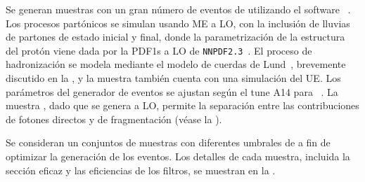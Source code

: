 Se generan muestras con un gran n\'umero de eventos de \gammajet utilizando el software ~\cite{Pythia8.1}. Los procesos partónicos se simulan usando \ac{ME} a \ac{LO}, con la inclusión de lluvias de partones de estado inicial y final, donde la parametrización de la estructura del protón viene dada por la \acp{PDF1} a \ac{LO} de \texttt{NNPDF2.3}~\cite{NNPDF2}.
El proceso de hadronización se modela mediante el modelo de cuerdas de Lund~\cite{Anderson-1983}, brevemente discutido en la \Sect{\ref{subsec:theory:mc_simulation:hadronisation}}, y la muestra también cuenta con una simulación del \ac{UE}.
Los parámetros del generador de eventos se ajustan según el tune A14 para \Pythia~\cite{Pythia-A14Tune}.
La muestra \pythia, dado que se genera a \ac{LO}, permite la separación entre las contribuciones de fotones directos y de fragmentación (véase la \Sect{\ref{subsec:theory:sm:prompt_photon}}).

Se consideran un conjuntos de muestras con diferentes umbrales de \pt a fin de optimizar la generación de los eventos. Los detalles de cada muestra, incluida la sección eficaz y las eficiencias de los filtros, se muestran en la \Tab{\ref{tab:samples:samples:bkg:samples}}.

